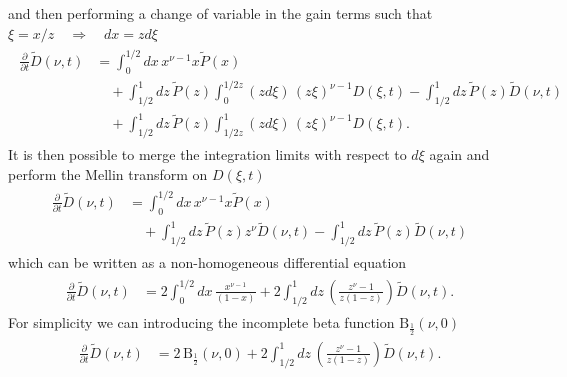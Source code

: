 \documentclass[main.tex]{subfiles}
\begin{document}
and then performing a change of variable in the gain terms such that \(\xi = x/z \quad \Rightarrow \quad dx = z d\xi\)
\begin{align}
    \begin{split}
    \frac{\partial}{\partial t} \tilde{D}(\nu,t) &= \int_0^{1/2} dx\, x^{\nu-1} x \tilde{P}(x) \\
    &\quad + \int_{1/2}^{1} dz \, \tilde{P}(z) \int_0^{1/2z} (zd\xi)\, (z\xi)^{\nu-1} D(\xi,t) -\int_{1/2}^1dz\, \tilde{P}(z) \tilde{D}(\nu,t) \\
    &\quad + \int_{1/2}^{1} dz \, \tilde{P}(z) \int_{1/2z}^1 (zd\xi)\, (z\xi)^{\nu-1} D(\xi,t).
    \end{split}
\end{align}
It is then possible to merge the integration limits with respect to \(d\xi\) again and perform the Mellin transform on \(D(\xi,t)\)
\begin{align}
    \begin{split}
    \frac{\partial}{\partial t} \tilde{D}(\nu,t) &= \int_0^{1/2} dx\, x^{\nu-1} x \tilde{P}(x) \\
    &\quad + \int_{1/2}^{1} dz \, \tilde{P}(z) z^\nu \tilde{D}(\nu,t) -\int_{1/2}^1dz\, \tilde{P}(z) \tilde{D}(\nu,t) 
    \end{split}
\end{align}
which can be written as a non-homogeneous differential equation
\begin{align}
    \begin{split}
    \frac{\partial}{\partial t} \tilde{D}(\nu,t) &= 2\int_0^{1/2} dx\, \frac{x^{\nu-1}}{(1-x)} + 2\int_{1/2}^{1} dz \, \left( \frac{z^\nu-1}{z(1-z)}\right) \tilde{D}(\nu,t).
    \end{split}
\end{align}
For simplicity we can introducing the incomplete beta function \(\mathrm{B}_{\frac{1}{2}}(\nu,0)\)
\begin{align}\label{eqn: leading_parton_vacuum_diferentialequationsolution}
    \begin{split}
    \frac{\partial}{\partial t} \tilde{D}(\nu,t) &= 2 \, \mathrm{B}_{\frac{1}{2}}(\nu,0) + 2\int_{1/2}^{1} dz \, \left( \frac{z^\nu-1}{z(1-z)}\right) \tilde{D}(\nu,t).
    \end{split}
\end{align}
\end{document}
